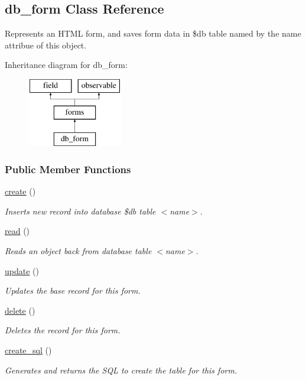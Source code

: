 \hypertarget{classdb__form}{\subsection{db\-\_\-form Class Reference}
\label{classdb__form}
}


Represents an H\-T\-M\-L form, and saves form data in \$db table named by the name attribue of this object.  


Inheritance diagram for db\-\_\-form\-:\begin{figure}[H]
\begin{center}
\leavevmode
\includegraphics[height=3.000000cm]{classdb__form}
\end{center}
\end{figure}
\subsubsection*{Public Member Functions}
\begin{DoxyCompactItemize}
\item 
\hyperlink{classdb__form_af9e3c532c73b0c3bf82996e54f0390c7}{create} ()
\begin{DoxyCompactList}\small\item\em Inserts new record into database \$db table $<$name$>$. \end{DoxyCompactList}\item 
\hyperlink{classdb__form_aa77f60c8ca3cd52f28ea455eaa2f633d}{read} ()
\begin{DoxyCompactList}\small\item\em Reads an object back from database table $<$name$>$. \end{DoxyCompactList}\item 
\hyperlink{classdb__form_a132f6a150aad88391ce063711c08ace3}{update} ()
\begin{DoxyCompactList}\small\item\em Updates the base record for this form. \end{DoxyCompactList}\item 
\hyperlink{classdb__form_a09bce6f14faa4db14589a8627c782b4c}{delete} ()
\begin{DoxyCompactList}\small\item\em Deletes the record for this form. \end{DoxyCompactList}\item 
\hyperlink{classdb__form_a39893c90e5b3364fdae768079ff66520}{create\-\_\-sql} ()
\begin{DoxyCompactList}\small\item\em Generates and returns the S\-Q\-L to create the table for this form. \end{DoxyCompactList}\end{DoxyCompactItemize}
